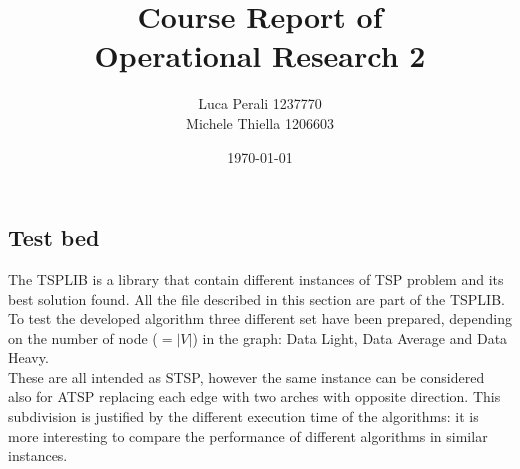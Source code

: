 \documentclass[10pt, english, openany]{report}
\title{Course Report of \\ Operational Research 2}
\author{Luca Perali 1237770 \\ Michele Thiella 1206603}
\date{\today}
\begin{document}

	
	

	\tableofcontents{}
	\clearpage

	
	
	
	
	
	
	
	\clearpage
	
	\begin{appendices}
		\chapter{Test bed} \label{sec:testset}
		The TSPLIB \cite{TSPLIB} is a library that contain different instances of TSP problem and its best solution found. All the file described in this section are part of the TSPLIB. To test the developed algorithm three different set have been prepared, depending on the number of node ($=|V|$) in the graph: Data Light, Data Average and Data Heavy.\\
		These are all intended as STSP, however the same instance can be considered also for ATSP replacing each edge with two arches with opposite direction. This subdivision is justified by the different execution time of the algorithms: it is more interesting to compare the performance of different algorithms in similar instances.\\
		

\end{appendices}
\end{document}
